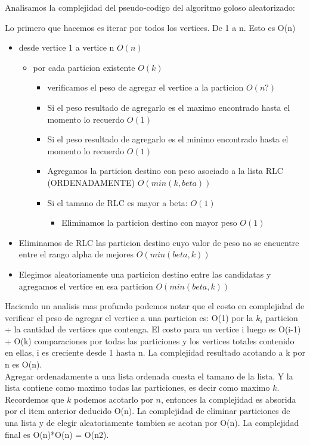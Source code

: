 Analisamos la complejidad del pseudo-codigo del algoritmo goloso aleatorizado:

Lo primero que hacemos es iterar por todos los vertices. De 1 a n. Esto es O(n)
\begin{itemize}
\item desde vertice 1 a vertice n       $O(n)$
    \begin{itemize}
    \item por cada particion existente    $O(k)$
        \begin{itemize}
        \item verificamos el peso de agregar el vertice a la particion     $O(n?)$
        \item Si el peso resultado de agregarlo es el maximo encontrado hasta el momento lo recuerdo $O(1)$
        \item Si el peso resultado de agregarlo es el minimo encontrado hasta el momento lo recuerdo $O(1)$
        \item Agregamos la particion destino con peso asociado a la lista RLC (ORDENADAMENTE)  $O(min(k,beta))$
        \item Si el tamano de RLC es mayor a beta: $O(1)$
            \begin{itemize}
            \item Eliminamos la particion destino con mayor peso  $O(1)$
            \end{itemize}
        \end{itemize}
    \end{itemize}
    \item Eliminamos de RLC las particion destino cuyo valor de peso no se encuentre entre el rango alpha de mejores $O(min(beta, k))$
    \item Elegimos aleatoriamente una particion destino entre las candidatas y agregamos el vertice en esa particion $O(min(beta, k))$
\end{itemize}

Haciendo un analisis mas profundo podemos notar que el costo en complejidad de verificar el peso de agregar el vertice a una particion es: O(1) por la $k_{i}$ particion + la cantidad de vertices que contenga. El costo para un vertice i luego es O(i-1) + O(k) comparaciones por todas las particiones y los vertices totales contenido en ellas, i es creciente desde 1 hasta n. La complejidad resultado acotando a k por n es O(n). \\
Agregar ordenadamente a una lista ordenada cuesta el tamano de la lista. Y la lista contiene como maximo todas las particiones, es decir como maximo $k$. Recordemos que $k$ podemos acotarlo por $n$, entonces la complejidad es absorida por el item anterior deducido O(n).
La complejidad de eliminar particiones de una lista y de elegir aleatoriamente tambien se acotan por O(n). La complejidad final es O(n)*O(n) = O(n2). \\

